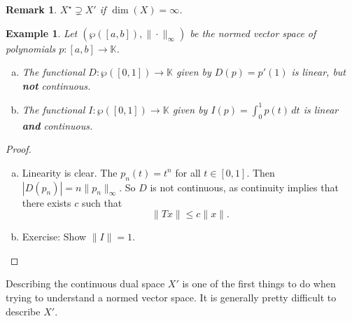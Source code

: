 \documentclass[12pt, oneside, a4paper]{article}
\theoremstyle{dfn}
\newtheorem{rem}[thm]{Remark}
\newtheorem{ex}[thm]{Example}
\newcommand{\K}{\mathbb{K}}
\begin{document}
\begin{rem}
    $X^\star \supsetneq X'$ if $\dim(X) = \infty$.
\end{rem}

\begin{ex}
    Let $(\wp([a,b]), \| \cdot \|_\infty)$ be the normed vector space of polynomials $p: [a,b] \rightarrow \K$.                 
    \begin{enumerate}[(a)]
        \item The functional $D : \wp([0,1]) \rightarrow \K$ given by $D(p) = p'(1)$ is linear, but \textbf{not} continuous.
        \item The functional $I: \wp([0,1]) \rightarrow \K$ given by $I(p) = \int_0^1 p(t) \, dt$ is linear \textbf{and} continuous.
    \end{enumerate}
\end{ex}

\begin{proof}
\begin{enumerate}[(a)]
        \item Linearity is clear.  The $p_n(t) = t^n$ for all $t \in [0,1]$.  Then $|D(p_n)| =   n \| p_n \|_\infty$.  So $D$ is not continuous, as continuity implies that there exists $c$ such that \[
            \| Tx \| \leq c \| x \|.
        \]
        \item Exercise: Show $\| I \| = 1$.
\end{enumerate}
\end{proof}

Describing the continuous dual space $X'$ is one of the first things to do when trying to understand a normed vector space.  It is generally pretty difficult to describe $X'$.
\end{document}
